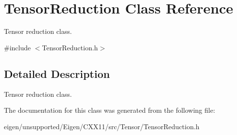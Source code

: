 \hypertarget{class_tensor_reduction}{}\section{Tensor\+Reduction Class Reference}
\label{class_tensor_reduction}


Tensor reduction class.  




{\ttfamily \#include $<$Tensor\+Reduction.\+h$>$}



\subsection{Detailed Description}
Tensor reduction class. 

The documentation for this class was generated from the following file\+:\begin{DoxyCompactItemize}
\item 
eigen/unsupported/\+Eigen/\+C\+X\+X11/src/\+Tensor/\+Tensor\+Reduction.\+h\end{DoxyCompactItemize}
